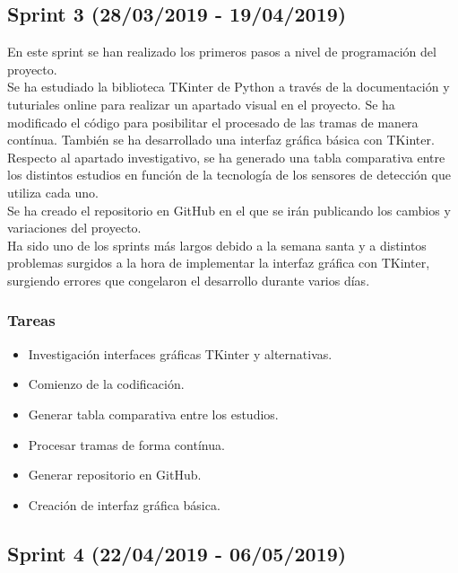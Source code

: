 
\subsection{Sprint 3 (28/03/2019 - 19/04/2019)}
En este sprint se han realizado los primeros pasos a nivel de programación del proyecto.\\ Se ha estudiado la biblioteca TKinter de Python a través de la documentación y tuturiales online para realizar un apartado visual en el proyecto. Se ha modificado el código para posibilitar el procesado de las tramas de manera contínua. También se ha desarrollado una interfaz gráfica básica con TKinter. \\ Respecto al apartado investigativo, se ha generado una tabla comparativa entre los distintos estudios en función de la tecnología de los sensores de detección que utiliza cada uno.\\ Se ha creado el repositorio en GitHub en el que se irán publicando los cambios y variaciones del proyecto.\\ Ha sido uno de los sprints más largos debido a la semana santa y a distintos problemas surgidos a la hora de implementar la interfaz gráfica con TKinter, surgiendo errores que congelaron el desarrollo durante varios días.



\subsubsection{Tareas}
\begin{itemize}
\item Investigación interfaces gráficas TKinter y alternativas.
\item Comienzo de la codificación.
\item Generar tabla comparativa entre los estudios.
\item Procesar tramas de forma contínua.
\item Generar repositorio en GitHub.
\item Creación de interfaz gráfica básica.
\end{itemize}


\subsection{Sprint 4 (22/04/2019 - 06/05/2019)}

